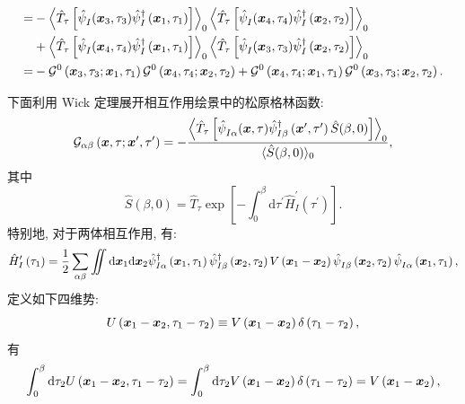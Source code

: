 \begin{example}
\begin{align}
=&-\left\langle\hat{T}_\tau\left[\hat{\psi}^{}_{I}(\boldsymbol{x}_3, \tau_3) \hat{\psi}^{\dagger}_{I}\left(\boldsymbol{x}_1, \tau_1 \right)\right]\right\rangle_0 \left\langle\hat{T}_\tau\left[\hat{\psi}^{}_{I}(\boldsymbol{x}_4, \tau_4) \hat{\psi}^{\dagger}_{I}\left(\boldsymbol{x}_2, \tau_2 \right)\right]\right\rangle_0\nonumber\\
&+\left\langle\hat{T}_\tau\left[\hat{\psi}^{}_{I}(\boldsymbol{x}_4, \tau_4) \hat{\psi}^{\dagger}_{I}\left(\boldsymbol{x}_1, \tau_1 \right)\right]\right\rangle_0 \left\langle\hat{T}_\tau\left[\hat{\psi}^{}_{I}(\boldsymbol{x}_3, \tau_3) \hat{\psi}^{\dagger}_{I}\left(\boldsymbol{x}_2, \tau_2 \right)\right]\right\rangle_0\nonumber\\
= & -\mathcal{G}^0\left(\boldsymbol{x}_3, \tau_3 ; \boldsymbol{x}_1, \tau_1\right) \mathcal{G}^0\left(\boldsymbol{x}_4, \tau_4 ; \boldsymbol{x}_2, \tau_2\right)+\mathcal{G}^0\left(\boldsymbol{x}_4, \tau_4 ; \boldsymbol{x}_1, \tau_1\right) \mathcal{G}^0\left(\boldsymbol{x}_3, \tau_3 ; \boldsymbol{x}_2, \tau_2\right) .
\end{align}
\end{example}
下面利用 Wick 定理展开相互作用绘景中的松原格林函数:
\begin{equation}
\mathcal{G}_{\alpha \beta}\left(\boldsymbol{x}, \tau ; \boldsymbol{x}^{\prime}, \tau^{\prime}\right)=-\frac{\left\langle\hat{T}_\tau\left[\hat{\psi}^{}_{I \alpha}(\boldsymbol{x}, \tau) \hat{\psi}_{I \beta}^{\dagger}\left(\boldsymbol{x}^{\prime}, \tau^{\prime}\right) \hat{S}(\beta, 0)\right]\right\rangle_0}{\langle\hat{S}(\beta, 0)\rangle_0}, 
\end{equation}
其中
\begin{equation}
\hat{S}(\beta, 0)=\hat{T}_\tau \exp \left[-\int_0^\beta \mathrm{d} \tau^{\prime} \hat{H}_I^{\prime}\left(\tau^{\prime}\right)\right].
\end{equation}
特别地, 对于两体相互作用, 有:
\begin{equation}
\hat{H}_I^{\prime}\left(\tau_1\right)=\frac{1}{2} \sum\limits_{\alpha\beta}\iint \mathrm{d} \boldsymbol{x}_1 \mathrm{d} \boldsymbol{x}_2 \hat{\psi}_{I \alpha}^{\dagger}\left(\boldsymbol{x}_1, \tau_1\right) \hat{\psi}_{I \beta}^{\dagger}\left(\boldsymbol{x}_2, \tau_2\right) V\left(\boldsymbol{x}_1- \boldsymbol{x}_2\right) \hat{\psi}^{}_{I \beta}\left(\boldsymbol{x}_2, \tau_2\right) \hat{\psi}^{}_{I \alpha}\left(\boldsymbol{x}_1, \tau_1\right) ,
\end{equation}
定义如下四维势:
\begin{equation}
U\left(\boldsymbol{x}_1-\boldsymbol{x}_2, \tau_1-\tau_2 \right) \equiv V\left(\boldsymbol{x}_1-\boldsymbol{x}_2\right) \delta\left(\tau_1-\tau_2\right),
\end{equation}
有
\begin{equation}
\int_0^\beta  \mathrm{d} \tau_2 U\left(\boldsymbol{x}_1-\boldsymbol{x}_2, \tau_1-\tau_2 \right)=\int_0^\beta  \mathrm{d} \tau_2 V\left(\boldsymbol{x}_1-\boldsymbol{x}_2\right) \delta\left(\tau_1-\tau_2\right)=V\left(\boldsymbol{x}_1-\boldsymbol{x}_2\right),
\end{equation}
